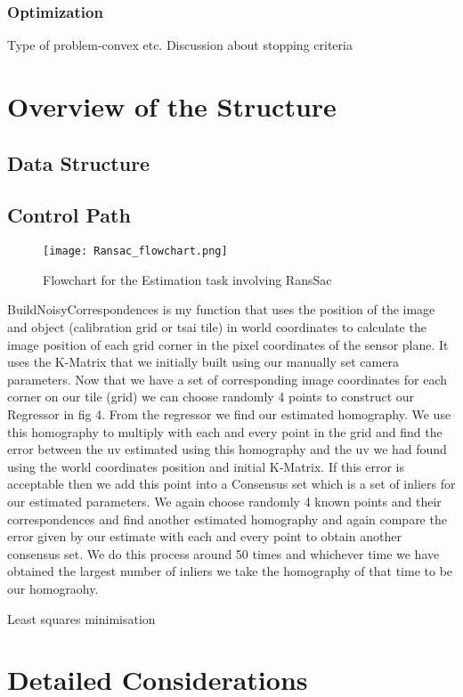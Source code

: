 \documentclass[titlepage]{article}
\begin{document}
\subsubsection{Optimization}
Type of problem-convex etc.
Discussion about stopping criteria

\section{Overview of the Structure}
\subsection{Data Structure}
\subsection{Control Path}
\begin{wrapfigure}{r}{5.5cm}
\caption{Flowchart for the Estimation task involving RansSac}\label{wrap-fig:1}
\texttt{[image: Ransac\_flowchart.png]}
\end{wrapfigure} 
BuildNoisyCorrespondences is my function that uses the position of the image and object (calibration grid or tsai tile) in world coordinates to calculate the image position of each grid corner in the pixel coordinates of the sensor plane. It uses the K-Matrix that we initially built using our manually set camera parameters. Now that we have a set of corresponding image coordinates for each corner on our tile (grid) we can choose randomly 4 points to construct our Regressor in fig 4. From the regressor we find our estimated homography. We use this homography to multiply with each and every point in the grid and find the error between the uv estimated using this homography and the uv we had found using the world coordinates position and initial K-Matrix. If this error is acceptable then we add this point into a Consensus set which is a set of inliers for our estimated parameters. We again choose randomly 4 known points and their correspondences and find another estimated homography and again compare the error given by our estimate with each and every point to obtain another consensus set. We do this process around 50 times and whichever time we have obtained the largest number of inliers we take the homography of that time to be our homograohy.

Least squares minimisation 

\section{Detailed Considerations}
\end{document}

